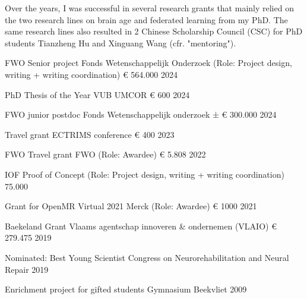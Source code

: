 
Over the years, I was successful in several research grants that mainly relied on the two research lines on brain age and federated learning from my PhD. The same research lines also resulted in 2 Chinese Scholarship Council (CSC) for PhD students Tianzheng Hu and Xinguang Wang (cfr. "mentoring").


\begin{cvhonors}

  \cvhonor
    {FWO Senior project} %
    {Fonds Wetenschappelijk Onderzoek (Role: Project design, writing + writing coordination)} %
    {€ 564.000} %
    {2024} %

  \cvhonor
    {PhD Thesis of the Year} %
    {VUB UMCOR} %
    {€ 600} %
    {2024} %

  \cvhonor
    {FWO junior postdoc} %
    {Fonds Wetenschappelijk onderzoek} %
    {± € 300.000} %
    {2024} %

  \cvhonor
    {Travel grant} %
    {ECTRIMS conference} %
    {€ 400} %
    {2023} %

  \cvhonor
    {FWO Travel grant} %
    {FWO (Role: Awardee)} %
    {€ 5.808} %
    {2022} %

  \cvhonor
    {IOF Proof of Concept} %
    { (Role: Project design, writing + writing coordination)} %
    {75.000} %
    {} %

  \cvhonor
    {Grant for OpenMR Virtual 2021} %
    {Merck (Role: Awardee)} %
    {€ 1000} %
    {2021} %

  \cvhonor
    {Baekeland Grant} %
    {Vlaams agentschap innoveren \& ondernemen (VLAIO)} %
    {€ 279.475} %
    {2019} %

  \cvhonor
    {Nominated: Best Young Scientist} %
    {Congress on Neurorehabilitation and Neural Repair} %
    {} %
    {2019} %

  \cvhonor
    {Enrichment project for gifted students} %
    {Gymnasium Beekvliet} %
    {} %
    {2009} %

\end{cvhonors}